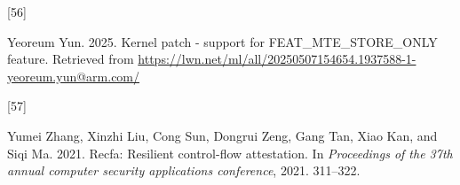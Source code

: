 \documentclass[a4paper, nobind]{templates/ociamthesis}
\newlength{\cslhangindent}
\newlength{\csllabelwidth}
\newenvironment{CSLReferences}[2] %
{\begin{list}{}{%
	\setlength{\itemindent}{0pt}
	\setlength{\leftmargin}{0pt}
	\setlength{\parsep}{0pt}
	\ifodd #1
	\setlength{\leftmargin}{\cslhangindent}
	\setlength{\itemindent}{-1\cslhangindent}
	\fi
	\setlength{\itemsep}{#2\baselineskip}}}
{\end{list}}
\newcommand{\CSLLeftMargin}[1]{\parbox[t]{\csllabelwidth}{\strut#1\strut}}
\newcommand{\CSLRightInline}[1]{\parbox[t]{\linewidth - \csllabelwidth}{\strut#1\strut}}
\begin{document}
\begin{CSLReferences}{0}{0}
\CSLLeftMargin{{[}56{]} }%
\CSLRightInline{Yeoreum Yun. 2025. Kernel patch - support for FEAT\_MTE\_STORE\_ONLY feature. Retrieved from \url{https://lwn.net/ml/all/20250507154654.1937588-1-yeoreum.yun@arm.com/}}

\CSLLeftMargin{{[}57{]} }%
\CSLRightInline{Yumei Zhang, Xinzhi Liu, Cong Sun, Dongrui Zeng, Gang Tan, Xiao Kan, and Siqi Ma. 2021. Recfa: Resilient control-flow attestation. In \emph{Proceedings of the 37th annual computer security applications conference}, 2021. 311--322.}

\end{CSLReferences}

\end{document}
